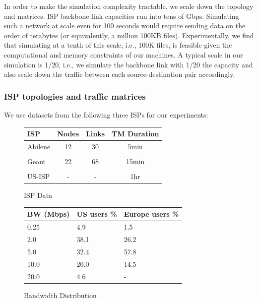 In order to make the simulation complexity tractable, we scale down the topology and matrices.
ISP backbone link capacities run into tens of Gbps. Simulating such a network at scale even for 100 seconds would require sending data on the order of terabytes (or equivalently, a million 100KB files). Experimentally, we find that simulating at a tenth of this scale, i.e., 100K files, is feasible given the computational and memory constraints of our machines. A typical scale in our simulation is 1/20, i.e., we simulate the backbone link with 1/20 the capacity and also scale down the traffic between each source-destination pair accordingly.




\subsubsection{ISP topologies and traffic matrices}  We use datasets from the following three ISPs for our experiments:

\begin{figure}\footnotesize
\begin{minipage}[b]{0.55\textwidth}
    \begin{tabular}{ l | c | c |   c }
\textbf{ISP} &\textbf{Nodes}  & \textbf{Links}  & \textbf{TM Duration} \\ \hline
Abilene & 12 & 30 & 5min	\\
&&&\\
Geant  & 22 & 68 & 15min \\
&&&\\
US-ISP & - & - & 1hr\\ 
  \end{tabular}
 \caption{ISP Data}
\label{fig:ISP_data}
\end{minipage}
\begin{minipage}[b]{0.45\textwidth}
  \begin{tabular}{ p{1.2cm} | p{1.5cm} | p{1.5cm}  }
\textbf{BW (Mbps)} &\textbf{US users \%}  & \textbf{Europe users \% } \\ \hline 
0.25 & 4.9 &   1.5 \\
2.0  & 38.1 & 26.2  \\
5.0 & 32.4 & 57.8	\\
10.0 & 20.0 & 14.5 \\
20.0 & 4.6 & - \\
  \end{tabular}
  \caption{Bandwidth Distribution}
\label{fig:bandwidth_distribution}
\end{minipage}
\end{figure}

